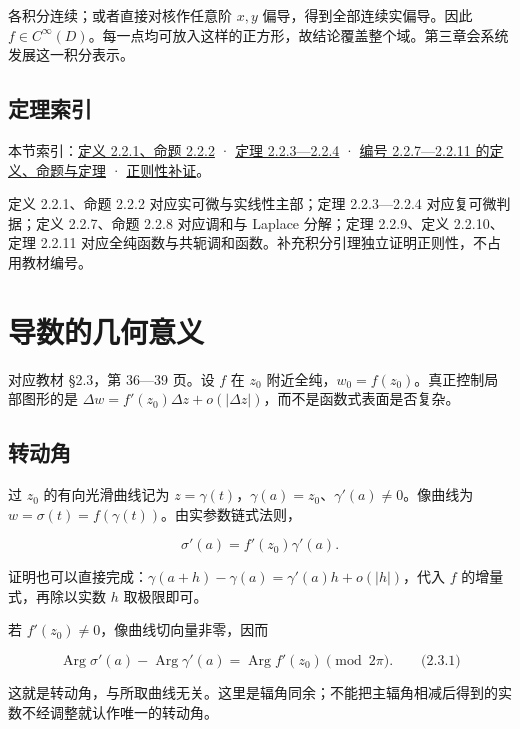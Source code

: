\documentclass[11pt,a4paper]{article}
\begin{document}
各积分连续；或者直接对核作任意阶 \(x,y\) 偏导，得到全部连续实偏导。因此
\(f\in C^\infty(D)\)。每一点均可放入这样的正方形，故结论覆盖整个域。第三章会系统发展这一积分表示。

\subsection{定理索引}\label{ch02-s2-ux5b9aux7406ux7d22ux5f15}

本节索引：\hyperref[ch02-s2-ux5b9eux7ebfux6027ux4e3bux90e8]{定义 2.2.1、命题
2.2.2} ·
\hyperref[ch02-s2-ux590dux53efux5faeux7684ux5145ux8981ux6761ux4ef6]{定理
2.2.3---2.2.4} ·
\hyperref[ch02-s2-ux8c03ux548cux4e0eux5171ux8f6dux8c03ux548c]{编号
2.2.7---2.2.11 的定义、命题与定理} ·
\hyperref[ch02-s2-ux5168ux7eafux6b63ux5219ux6027ux7684ux8865ux8bc1]{正则性补证}。

定义 2.2.1、命题 2.2.2 对应实可微与实线性主部；定理 2.2.3---2.2.4
对应复可微判据；定义 2.2.7、命题 2.2.8 对应调和与 Laplace 分解；定理
2.2.9、定义 2.2.10、定理 2.2.11
对应全纯函数与共轭调和函数。补充积分引理独立证明正则性，不占用教材编号。

\section{导数的几何意义}
对应教材 §2.3，第 36---39 页。设 \(f\) 在 \(z_0\)
附近全纯，\(w_0=f(z_0)\)。真正控制局部图形的是
\(\Delta w=f'(z_0)\Delta z+o(|\Delta z|)\)，而不是函数式表面是否复杂。

\subsection{转动角}\label{ch02-s3-ux8f6cux52a8ux89d2}

过 \(z_0\) 的有向光滑曲线记为
\(z=\gamma(t)\)，\(\gamma(a)=z_0\)、\(\gamma'(a)\ne0\)。像曲线为
\(w=\sigma(t)=f(\gamma(t))\)。由实参数链式法则，

\[
\sigma'(a)=f'(z_0)\gamma'(a).
\]

证明也可以直接完成：\(\gamma(a+h)-\gamma(a)=\gamma'(a)h+o(|h|)\)，代入
\(f\) 的增量式，再除以实数 \(h\) 取极限即可。

若 \(f'(z_0)\ne0\)，像曲线切向量非零，因而

\[
\operatorname{Arg}\sigma'(a)-\operatorname{Arg}\gamma'(a)
=\operatorname{Arg}f'(z_0)\pmod{2\pi}.
\qquad\text{(2.3.1)}
\]

这就是转动角，与所取曲线无关。这里是辐角同余；不能把主辐角相减后得到的实数不经调整就认作唯一的转动角。
\end{document}
